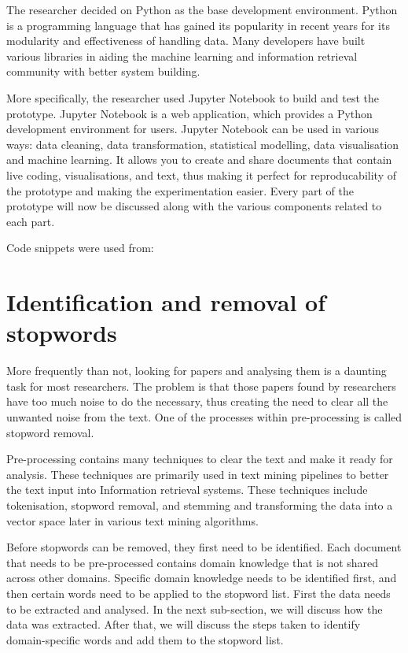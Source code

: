 The researcher decided on Python as the base development environment. Python is a programming language that has gained its popularity in recent years for its modularity and effectiveness of handling data. Many developers have built various libraries in aiding the machine learning and information retrieval community with better system building.

More specifically, the researcher used Jupyter Notebook to build and test the prototype. Jupyter Notebook is a web application, which provides a Python development environment for users. Jupyter Notebook can be used in various ways: data cleaning, data transformation, statistical modelling, data visualisation and machine learning. It allows you to create and share documents that contain live coding, visualisations, and text, thus making it perfect for reproducability of the prototype and making the experimentation easier.
Every part of the prototype will now be discussed along with the various components related to each part.

Code snippets were used from:



\section{Identification and removal of stopwords} \label{ssec:pre}

More frequently than not, looking for papers and analysing them is a daunting task for most researchers. The problem is that those papers found by researchers have too much noise to do the necessary, thus creating the need to clear all the unwanted noise from the text. One of the processes within pre-processing is called stopword removal.

Pre-processing contains many techniques to clear the text and make it ready for analysis. These techniques are primarily used in text mining pipelines to better the text input into Information retrieval systems. These techniques include tokenisation, stopword removal, and stemming and transforming the data into a vector space later in various text mining algorithms.

Before stopwords can be removed, they first need to be identified. Each document that needs to be pre-processed contains domain knowledge that is not shared across other domains. Specific domain knowledge needs to be identified first, and then certain words need to be applied to the stopword list. First the data needs to be extracted and analysed. In the next sub-section, we will discuss how the data was extracted. After that, we will discuss the steps taken to identify domain-specific words and add them to the stopword list.

